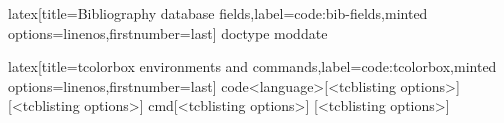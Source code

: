 \begin{code}{latex}[title={Bibliography database fields},label=code:bib-fields,minted options={linenos,firstnumber=last}]
doctype
moddate
\end{code}
%
\begin{code}{latex}[title={tcolorbox environments and commands},label=code:tcolorbox,minted options={linenos,firstnumber=last}]
{code}{<language>}[<tcblisting options>]
[<tcblisting options>]
{cmd}[<tcblisting options>]
[<tcblisting options>]
\end{code}

\begin{comment}

\clearpage
\subsection{subsection 1}

\section{Test appendix 2}

\section{Test appendix 3}
\clearpage
\subsection{subsection 1}
\clearpage
\subsection{subsection 2}

\end{comment}
